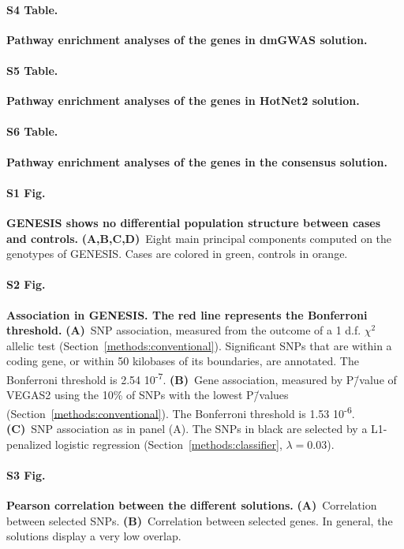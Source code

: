 \documentclass[10pt,letterpaper]{article}
\begin{document}
\paragraph*{S4 Table.}
\label{stab:dmgwas_pwy}
{\bf Pathway enrichment analyses of the genes in dmGWAS solution.}

\paragraph*{S5 Table.}
\label{stab:hotnet2_pwy}
{\bf Pathway enrichment analyses of the genes in HotNet2 solution.}

\paragraph*{S6 Table.}
\label{stab:consensus_pwy}
{\bf Pathway enrichment analyses of the genes in the consensus solution.}

\paragraph*{S1 Fig.}
\label{sfig:pcs}
{\bf GENESIS shows no differential population structure between cases and controls.} \textbf{(A,B,C,D)}~Eight main principal components computed on the genotypes of GENESIS. Cases are colored in green, controls in orange.

\paragraph*{S2 Fig.}
\label{sfig:snp_gene_manhattan}
{\bf Association in GENESIS. The red line represents the Bonferroni threshold.} \textbf{(A)}~SNP association, measured from the outcome of a 1 d.f. $\chi^2$ allelic test (Section~\ref{methods:conventional}). Significant SNPs that are within a coding gene, or within 50 kilobases of its boundaries, are annotated. The Bonferroni threshold is 2.54 \texttimes{} 10\textsuperscript{-7}. \textbf{(B)}~Gene association, measured by P\=/value of VEGAS2 \cite{mishra_vegas2:_2015} using the 10\% of SNPs with the lowest P\=/values (Section~\ref{methods:conventional}). The Bonferroni threshold is 1.53 \texttimes{} 10\textsuperscript{-6}. \textbf{(C)}~SNP association as in panel (A). The SNPs in black are selected by a L1-penalized logistic regression (Section~\ref{methods:classifier}, $\lambda = 0.03$).

\paragraph*{S3 Fig.}
\label{sfig:pearson_methods}
{\bf Pearson correlation between the different solutions. } \textbf{(A)}~Correlation between selected SNPs. \textbf{(B)}~Correlation between selected genes. In general, the solutions display a very low overlap.
  
\end{document}
